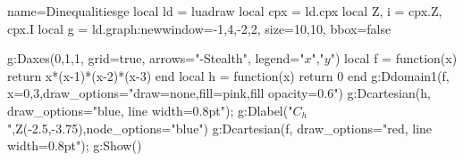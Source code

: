 \documentclass[border=2 mm]{standalone}
\begin{document}
\begin{luadraw}{name=Dinequalitiesge}
local ld = luadraw
local cpx = ld.cpx
local Z, i = cpx.Z, cpx.I
local g = ld.graph:new{window={-1,4,-2,2}, size={10,10}, bbox=false}

g:Daxes({0,1,1}, {grid=true, arrows="-Stealth", legend={"$x$","$y$"}})
local f = function(x) return x*(x-1)*(x-2)*(x-3)  end
local h = function(x) return 0 end
g:Ddomain1(f,{ x={0,3},draw_options="draw=none,fill=pink,fill opacity=0.6"})
g:Dcartesian(h, {draw_options="blue, line width=0.8pt"}); g:Dlabel("$C_h$",Z(-2.5,-3.75),{node_options="blue"})
g:Dcartesian(f, {draw_options="red, line width=0.8pt"});
g:Show()
\end{luadraw}
\end{document}
